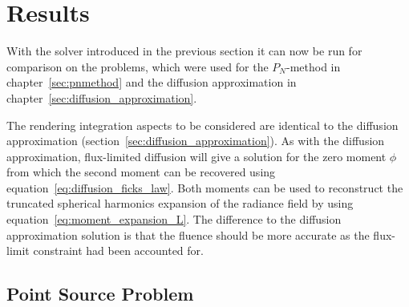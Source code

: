 \section{Results}
\label{sec:fld_results}

With the solver introduced in the previous section it can now be run for comparison on the problems, which were used for the $P_N$-method in chapter~\ref{sec:pnmethod} and the diffusion approximation in chapter~\ref{sec:diffusion_approximation}.

The rendering integration aspects to be considered are identical to the diffusion approximation (section~\ref{sec:diffusion_approximation}). As with the diffusion approximation, flux-limited diffusion will give a solution for the zero moment $\phi$ from which the second moment can be recovered using equation~\ref{eq:diffusion_ficks_law}. Both moments can be used to reconstruct the truncated spherical harmonics expansion of the radiance field by using equation~\ref{eq:moment_expansion_L}. The difference to the diffusion approximation solution is that the fluence should be more accurate as the flux-limit constraint had been accounted for.

\subsection{Point Source Problem}
\label{sec:fld_results_pointsource}

